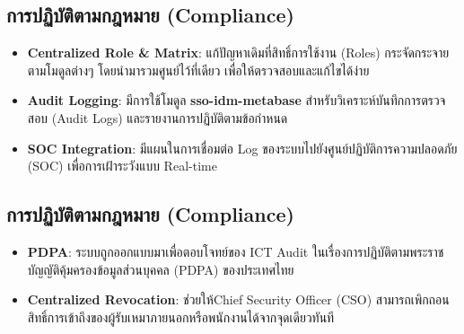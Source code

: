\newpage\sloppy
\subsection{การปฏิบัติตามกฎหมาย (Compliance)}
\begin{itemize}
    \item \textbf{Centralized Role \& Matrix}: แก้ปัญหาเดิมที่สิทธิ์การใช้งาน (Roles) กระจัดกระจายตามโมดูลต่างๆ โดยนำมารวมศูนย์ไว้ที่เดียว เพื่อให้ตรวจสอบและแก้ไขได้ง่าย\par
    \item \textbf{Audit Logging}: มีการใช้โมดูล \textbf{sso-idm-metabase} สำหรับวิเคราะห์บันทึกการตรวจสอบ (Audit Logs) และรายงานการปฏิบัติตามข้อกำหนด\par
    \item \textbf{SOC Integration}: มีแผนในการเชื่อมต่อ Log ของระบบไปยังศูนย์ปฏิบัติการความปลอดภัย (SOC) เพื่อการเฝ้าระวังแบบ Real-time\par
\end{itemize}

\subsection{การปฏิบัติตามกฎหมาย (Compliance)}
\begin{itemize}
    \item \textbf{PDPA}: ระบบถูกออกแบบมาเพื่อตอบโจทย์ของ ICT Audit ในเรื่องการปฏิบัติตามพระราชบัญญัติคุ้มครองข้อมูลส่วนบุคคล (PDPA) ของประเทศไทย\par
    \item \textbf{Centralized Revocation}: ช่วยให้Chief Security Officer (CSO) สามารถเพิกถอนสิทธิ์การเข้าถึงของผู้รับเหมาภายนอกหรือพนักงานได้จากจุดเดียวทันที\par
\end{itemize}
\fussy

